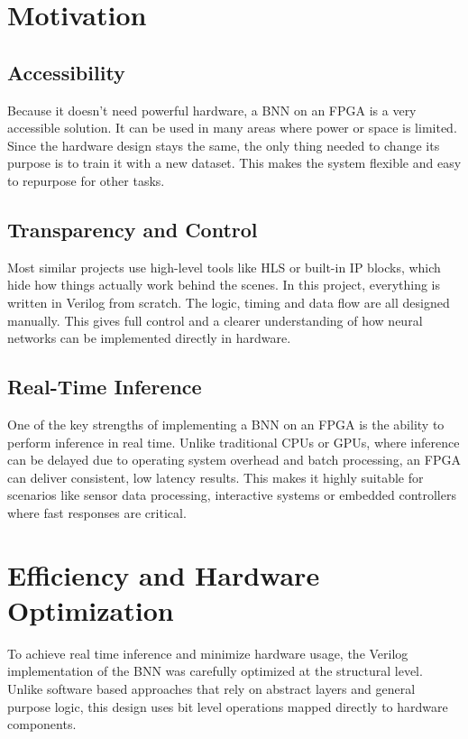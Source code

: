 \documentclass[a4paper,12pt]{report}
\begin{document}
\section{Motivation}

\subsection{Accessibility}
Because it doesn’t need powerful hardware, a BNN on an FPGA is a very accessible solution. It can be used in many areas where power or space is limited. Since the hardware design stays the same, the only thing needed to change its purpose is to train it with a new dataset. This makes the system flexible and easy to repurpose for other tasks.

\subsection{Transparency and Control}
Most similar projects use high-level tools like HLS or built-in IP blocks, which hide how things actually work behind the scenes. In this project, everything is written in Verilog from scratch. The logic, timing and data flow are all designed manually. This gives full control and a clearer understanding of how neural networks can be implemented directly in hardware.

\subsection{Real-Time Inference}
One of the key strengths of implementing a BNN on an FPGA is the ability to perform inference in real time. Unlike traditional CPUs or GPUs, where inference can be delayed due to operating system overhead and batch processing, an FPGA can deliver consistent, low latency results. This makes it highly suitable for scenarios like sensor data processing, interactive systems or embedded controllers where fast responses are critical.


\section{Efficiency and Hardware Optimization}

To achieve real time inference and minimize hardware usage, the Verilog implementation of the BNN was carefully optimized at the structural level. Unlike software based approaches that rely on abstract layers and general purpose logic, this design uses bit level operations mapped directly to hardware components.
\end{document}
